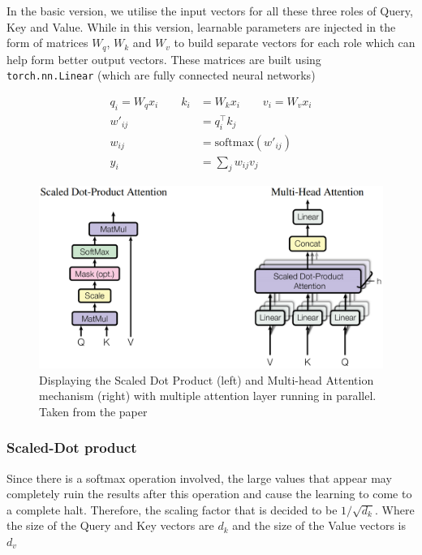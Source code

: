\documentclass[12pt,a4paper,twoside,openright]{report}
\begin{document}
In the basic version, we utilise the input vectors for all these three roles of Query, Key and Value. While in this version, learnable parameters are injected in the form of matrices $W_q$, $W_k$ and $W_v$ to build separate vectors for each role which can help form better output vectors. These matrices are built using \\ \lstinline{torch.nn.Linear} (which are fully connected neural networks)

\begin{align*}
    q_i = W_q x_i \qquad       k_i & = W_k x_i \qquad     v_i = W_v x_i \\
    w'_{ij} & = q_i^\top k_j \\
    w_{ij} & = \text{softmax}(w'_{ij}) \\
    y_i & = \sum_j w_{ij} v_j
\end{align*}

\begin{figure}
    \centering
    \includegraphics[width=\textwidth]{figs/multihead-attention.PNG}
    \caption{Displaying the Scaled Dot Product (left) and Multi-head Attention mechanism (right) with multiple attention layer running in parallel. Taken from the paper \cite{transformers}}
    \label{fig:my_label}
\end{figure}

\subsubsection{Scaled-Dot product}

Since there is a softmax operation involved, the large values that appear may completely ruin the results after this operation and cause the learning to come to a complete halt. 
Therefore, the scaling factor that is decided to be $1/\sqrt{d_k}$.
Where the size of the Query and Key vectors are $d_k$ and the size of the Value vectors is $d_v$
\end{document}
